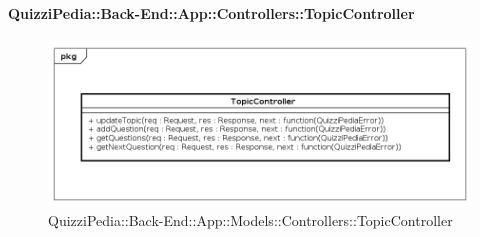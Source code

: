 \paragraph{QuizziPedia::Back-End::App::Controllers::TopicController}
\label{QuizziPedia::Back-End::App::Controllers::TopicController}
\begin{figure}[ht]
	\centering
	\includegraphics[scale=0.45]{UML/Classi/Back-End/QuizziPedia_Back-End_App_Controllers_topicController.png}
	\caption{QuizziPedia::Back-End::App::Models::Controllers::TopicController}
\end{figure}
\FloatBarrier
